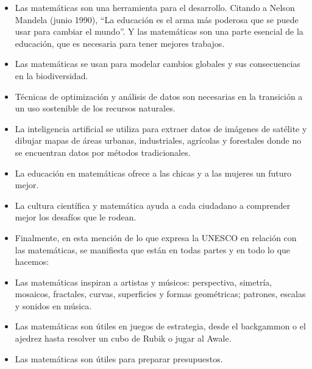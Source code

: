 \begin{itemize}
    
     \color{blue} \item \color{black} Las matemáticas son una herramienta para el desarrollo. Citando a Nelson Mandela (junio 1990), “La educación es el arma más poderosa que se puede usar para cambiar el mundo”. Y las matemáticas son una parte esencial de la educación, que es necesaria para tener mejores trabajos. 
    
    \color{blue} \item \color{black} Las matemáticas se usan para modelar cambios globales y sus consecuencias en la biodiversidad.
    
    \color{blue} \item \color{black} Técnicas de optimización y análisis de datos son necesarias en la transición a un uso sostenible de los recursos naturales.
    
    \color{blue} \item \color{black} La inteligencia artificial se utiliza para extraer datos de imágenes de satélite y dibujar mapas de áreas urbanas, industriales, agrícolas y forestales donde no se encuentran datos por métodos tradicionales.   

    \color{blue} \item \color{black} La educación en matemáticas ofrece a las chicas y a las mujeres un futuro mejor.   

    \color{blue} \item \color{black} La cultura científica y matemática ayuda a cada ciudadano a comprender mejor los desafíos que le rodean. 
    
     \color{blue} \item \color{black} Finalmente, en esta mención \cite{UNESCO2020IDM} de lo que expresa la UNESCO en relación con las matemáticas, se manifiesta que están en todas partes y en todo lo que hacemos: 
    
     \color{blue} \item \color{black} Las matemáticas inspiran a artistas y músicos: perspectiva, simetría, mosaicos, fractales, curvas, superficies y formas geométricas; patrones, escalas y sonidos en música. 
      
     \color{blue} \item \color{black} Las matemáticas son útiles en juegos de estrategia, desde el backgammon o el ajedrez hasta resolver un cubo de Rubik o jugar al Awale.   


    \color{blue} \item \color{black} Las matemáticas son útiles para preparar presupuestos.
     

\end{itemize}
